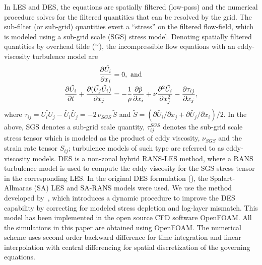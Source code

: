 In LES and DES, the equations are spatially filtered (low-pass) and the
numerical procedure solves for the filtered quantities that can be resolved by
the grid. The sub-filter (or sub-grid) quantities exert a ``stress'' on the
filtered flow-field, which is modeled using a sub-grid scale (SGS) stress
model. Denoting spatially filtered quantities by overhead tilde ($^\sim$), the
incompressible flow equations with an eddy-viscosity turbulence model are
%
\begin{align}
  \frac{\partial{\tilde{U_i}}}{\partial{x_i}}&=0,~{\rm and} \nonumber \\
   \frac{\partial{\tilde{U_i}}}{\partial{t}}+
   \frac{\partial{(\tilde{U_j}\tilde{U_i})}}{\partial{x_j}}
   &=-\frac{1}{\rho}\frac{\partial{\tilde{p}}}{\partial{x_i}}+\nu\frac{\partial{^2\tilde{U_i}}}{\partial{x_j^2}}-\frac{\partial{\tau_{ij}}}{\partial{x_j}},
 \label{eq:geqs}
\end{align}
%
where $\tau_{ij} = \widetilde{U_i U_j}-\tilde{U_i}\tilde{U_j} = -2 \, \nu_{SGS}
\, \tilde{S}$ and $\tilde{S} = (\partial{\tilde{U_i}}/\partial{x_j} +
\partial{\tilde{U_j}}/\partial{x_i})/2$. In the above, SGS denotes a sub-grid
scale quantity, $\tau_{ij}^{SGS}$ denotes the sub-grid scale stress tensor
which is modeled as the product of eddy viscosity, $\nu_{SGS}$ and the strain
rate tensor $S_{ij}$; turbulence models of such type are referred to as
eddy-viscosity models. DES is a non-zonal hybrid RANS-LES method, where a RANS
turbulence model is used to compute the eddy viscosity for the SGS stress
tensor in the corresponding LES. In the original DES formulation
(\cite{spalart1997comments}), the Spalart-Allmaras (SA) LES and SA-RANS models
were used. We use the method developed by~\cite{yin2015dynamic}, which
introduces a dynamic procedure to improve the DES capability by correcting for
modeled stress depletion and log-layer mismatch. This model has been
implemented in the open source CFD software OpenFOAM. All the simulations in
this paper are obtained using OpenFOAM. The numerical scheme uses second order
backward difference for time integration and linear interpolation with central
differencing for spatial discretization of the governing equations.

